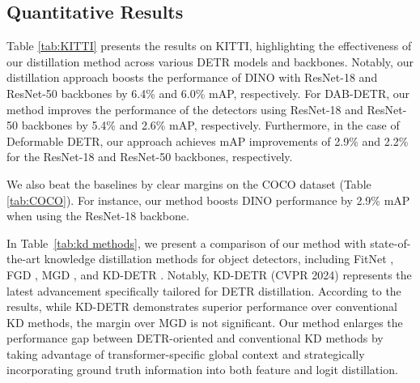 \subsection{Quantitative Results}
Table \ref{tab:KITTI} presents the results on KITTI, highlighting the effectiveness of our distillation method across various DETR models and backbones. Notably, our distillation approach boosts the performance of DINO with ResNet-18 and ResNet-50 backbones by 6.4\% and 6.0\% mAP, respectively. %
For DAB-DETR, our method improves the performance of the detectors using ResNet-18 and ResNet-50 backbones by 5.4\% and 2.6\% mAP, respectively. Furthermore, in the case of Deformable DETR, our approach achieves mAP improvements of 2.9\% and 2.2\% for the ResNet-18 and ResNet-50 backbones, respectively.


We also beat the baselines by clear margins on the COCO dataset (Table \ref{tab:COCO}). For instance, our method boosts DINO performance by 2.9\% mAP when using the ResNet-18 backbone. %

In Table~\ref{tab:kd methods}, we present a comparison of our method with state-of-the-art knowledge distillation methods for object detectors, including FitNet \cite{romero2014fitnets}, FGD \cite{yang2022focal}, MGD \cite{yang2022masked}, and KD-DETR \cite{wang2024knowledge}. Notably, KD-DETR \cite{wang2024knowledge} (CVPR 2024) represents the latest advancement specifically tailored for DETR distillation. According to the results, while KD-DETR demonstrates superior performance over conventional KD methods, the margin over MGD is not significant. Our method enlarges the performance gap between DETR-oriented and conventional KD methods by taking advantage of transformer-specific global context and strategically incorporating ground truth information into both feature and logit distillation. 


